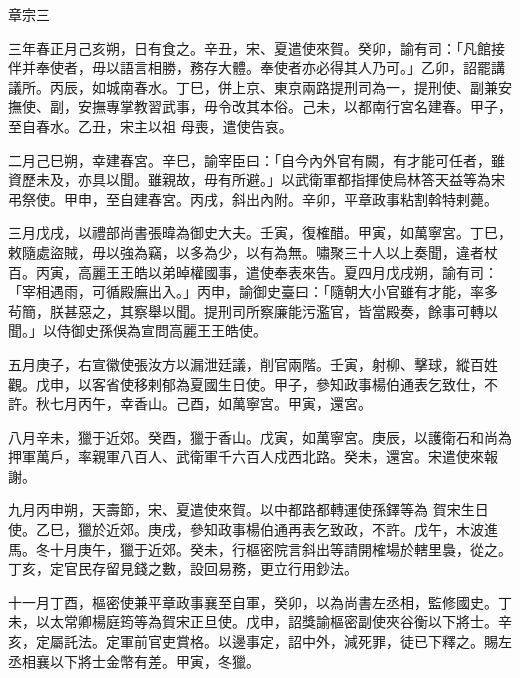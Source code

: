 
\begin{pinyinscope}

 章宗三



 三年春正月己亥朔，日有食之。辛丑，宋、夏遣使來賀。癸卯，諭有司：「凡館接伴并奉使者，毋以語言相勝，務存大體。奉使者亦必得其人乃可。」乙卯，詔罷講議所。丙辰，如城南春水。丁巳，併上京、東京兩路提刑司為一，提刑使、副兼安撫使、副，安撫專掌教習武事，毋令改其本俗。己未，以都南行宮名建春。甲子，至自春水。乙丑，宋主以祖
 母喪，遣使告哀。



 二月己巳朔，幸建春宮。辛巳，諭宰臣曰：「自今內外官有闕，有才能可任者，雖資歷未及，亦具以聞。雖親故，毋有所避。」以武衛軍都指揮使烏林答天益等為宋弔祭使。甲申，至自建春宮。丙戌，斜出內附。辛卯，平章政事粘割斡特剌薨。



 三月戊戌，以禮部尚書張暐為御史大夫。壬寅，復榷醋。甲寅，如萬寧宮。丁巳，敕隨處盜賊，毋以強為竊，以多為少，以有為無。嘯聚三十人以上奏聞，違者杖百。丙寅，高麗王王皓以弟晫權國事，遣使奉表來告。夏四月戊戌朔，諭有司：「宰相遇雨，可循殿廡出入。」丙申，諭御史臺曰：「隨朝大小官雖有才能，率多
 茍簡，朕甚惡之，其察舉以聞。提刑司所察廉能污濫官，皆當殿奏，餘事可轉以聞。」以侍御史孫俁為宣問高麗王王皓使。



 五月庚子，右宣徽使張汝方以漏泄廷議，削官兩階。壬寅，射柳、擊球，縱百姓觀。戊申，以客省使移剌郁為夏國生日使。甲子，參知政事楊伯通表乞致仕，不許。秋七月丙午，幸香山。己酉，如萬寧宮。甲寅，還宮。



 八月辛未，獵于近郊。癸酉，獵于香山。戊寅，如萬寧宮。庚辰，以護衛石和尚為押軍萬戶，率親軍八百人、武衛軍千六百人戍西北路。癸未，還宮。宋遣使來報謝。



 九月丙申朔，天壽節，宋、夏遣使來賀。以中都路都轉運使孫鐸等為
 賀宋生日使。乙巳，獵於近郊。庚戌，參知政事楊伯通再表乞致政，不許。戊午，木波進馬。冬十月庚午，獵于近郊。癸未，行樞密院言斜出等請開榷場於轄里裊，從之。丁亥，定官民存留見錢之數，設回易務，更立行用鈔法。



 十一月丁酉，樞密使兼平章政事襄至自軍，癸卯，以為尚書左丞相，監修國史。丁未，以太常卿楊庭筠等為賀宋正旦使。戊申，詔獎諭樞密副使夾谷衡以下將士。辛亥，定屬託法。定軍前官吏賞格。以邊事定，詔中外，減死罪，徒已下釋之。賜左丞相襄以下將士金幣有差。甲寅，冬獵。




\end{pinyinscope}
